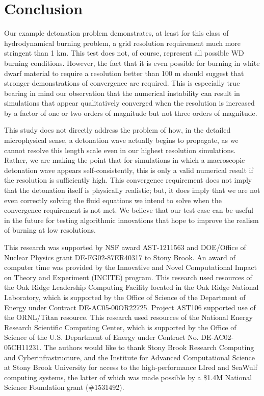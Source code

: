 \documentclass[twocolumn,numberedappendix,trackchanges]{../aastex62}
\begin{document}
\section{Conclusion}\label{Sec:Conclusion}
\label{sec:conclusion}

Our example detonation problem demonstrates, at least for this class of
hydrodynamical burning problem, a grid resolution requirement much more stringent
than 1 km. This test does not, of course, represent all possible WD burning conditions.
However, the fact that it is even possible for burning in white dwarf material to require a
resolution better than 100 m should suggest that stronger demonstrations of convergence are
required. This is especially true bearing in mind our observation that the numerical
instability can result in simulations that appear qualitatively converged when the
resolution is increased by a factor of one or two orders of magnitude but not three
orders of magnitude.

This study does not directly address the problem of how, in the detailed
microphysical sense, a detonation wave actually begins to propagate, as
we cannot resolve this length scale even in our highest resolution simulations.
Rather, we are making the point that for simulations in which a macroscopic
detonation wave appears self-consistently, this is only a valid numerical result
if the resolution is sufficiently high. This convergence requirement does
not imply that the detonation itself is physically realistic; but, it does
imply that we are not even correctly solving the fluid equations we intend
to solve when the convergence requirement is not met. We believe that our
test case can be useful in the future for testing algorithmic innovations
that hope to improve the realism of burning at low resolutions.



\acknowledgments

This research was supported by NSF award AST-1211563 and DOE/Office of
Nuclear Physics grant DE-FG02-87ER40317 to Stony Brook. An award of
computer time was provided by the Innovative and Novel Computational
Impact on Theory and Experiment (INCITE) program.  This research used
resources of the Oak Ridge Leadership Computing Facility located in
the Oak Ridge National Laboratory, which is supported by the Office of
Science of the Department of Energy under Contract
DE-AC05-00OR22725. Project AST106 supported use of the ORNL/Titan
resource.  This research used resources of the National Energy
Research Scientific Computing Center, which is supported by the Office
of Science of the U.S. Department of Energy under Contract
No. DE-AC02-05CH11231. The authors would like to thank Stony Brook
Research Computing and Cyberinfrastructure, and the Institute for
Advanced Computational Science at Stony Brook University for access
to the high-performance LIred and SeaWulf computing systems, the latter
of which was made possible by a \$1.4M National Science Foundation grant (\#1531492).
\end{document}
